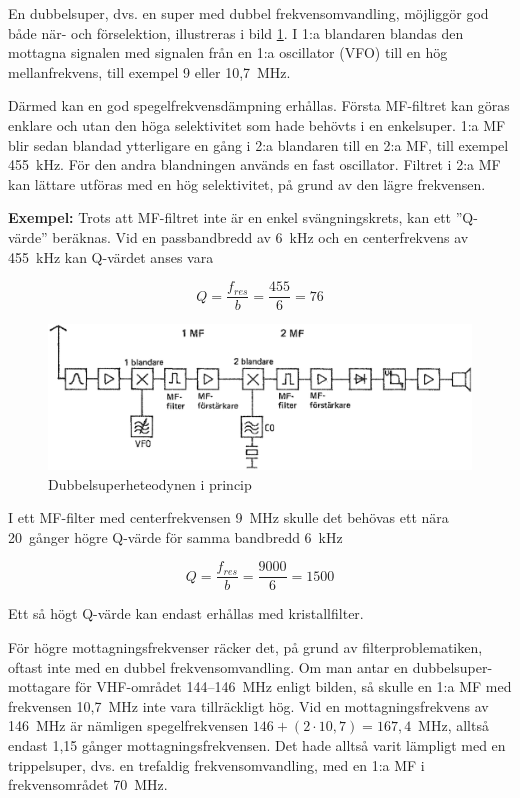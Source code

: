 En dubbelsuper, dvs. en super med dubbel frekvensomvandling,
möjliggör god både när- och förselektion, illustreras i bild
\ref{fig:bildII4-14}.
I 1:a blandaren blandas den mottagna signalen med signalen från en
1:a oscillator (VFO) till en hög mellanfrekvens, till exempel 9 eller 10,7~MHz.

Därmed kan en god spegelfrekvensdämpning erhållas.
Första MF-filtret kan göras enklare och utan den höga selektivitet som hade
behövts i en enkelsuper.
1:a MF blir sedan blandad ytterligare en gång i 2:a blandaren till en 2:a MF,
till exempel 455~kHz.
För den andra blandningen används en fast oscillator.
Filtret i 2:a MF kan lättare utföras med en hög selektivitet, på grund av den
lägre frekvensen.

\textbf{Exempel:}
Trots att MF-filtret inte är en enkel svängningskrets, kan ett ''Q-värde''
beräknas.
Vid en passbandbredd av 6~kHz och en centerfrekvens av 455~kHz kan Q-värdet
anses vara

\[ Q = \frac{f_{res}}{b} = \frac{455}{6} = 76 \]

\begin{figure}
  \includegraphics[width=\textwidth]{images/cropped_pdfs/bild_2_4-14.pdf}
  \caption{Dubbelsuperheteodynen i princip}
  \label{fig:bildII4-14}
\end{figure}

I ett MF-filter med centerfrekvensen 9~MHz skulle det behövas ett nära
20~gånger högre Q-värde för samma bandbredd 6~kHz

\[ Q = \frac{f_{res}}{b} = \frac{9000}{6} = 1500 \]

Ett så högt Q-värde kan endast erhållas med kristallfilter.

För högre mottagningsfrekvenser räcker det, på grund av filterproblematiken,
oftast inte med en dubbel frekvensomvandling.
Om man antar en dubbelsuper-mottagare för VHF-området 144--146~MHz enligt
bilden, så skulle en 1:a MF med frekvensen 10,7~MHz inte vara tillräckligt hög.
Vid en mottagningsfrekvens av 146~MHz är nämligen spegelfrekvensen
\(146 + (2 \cdot 10,7) = 167,4\)~MHz, alltså endast 1,15 gånger
mottagningsfrekvensen.
Det hade alltså varit lämpligt med en trippelsuper, dvs. en trefaldig
frekvensomvandling, med en 1:a MF i frekvensområdet 70~MHz.
